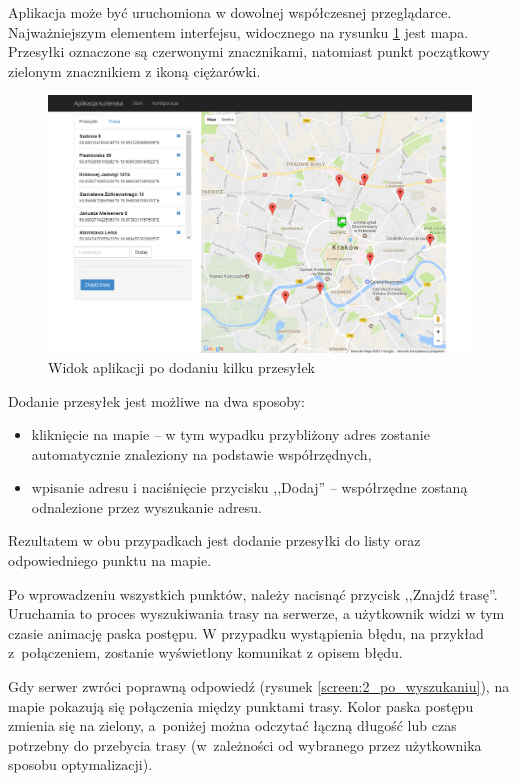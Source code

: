 Aplikacja może być uruchomiona w dowolnej współczesnej przeglądarce. Najważniejszym elementem interfejsu, widocznego na rysunku \ref{screen:1_przed_uruchomieniem} jest mapa. Przesyłki oznaczone są czerwonymi znacznikami, natomiast punkt początkowy zielonym znacznikiem z ikoną ciężarówki.
\begin{figure}
	\centering
	\includegraphics[width=\linewidth]{screen/1_przed_uruchomieniem}
	\caption{Widok aplikacji po dodaniu kilku przesyłek}
	\label{screen:1_przed_uruchomieniem}
\end{figure}

Dodanie przesyłek jest możliwe na dwa sposoby: 
\begin{itemize}
	\item kliknięcie na mapie -- w tym wypadku przybliżony adres zostanie automatycznie znaleziony na podstawie współrzędnych,
	\item wpisanie adresu i naciśnięcie przycisku ,,Dodaj'' -- współrzędne zostaną odnalezione przez wyszukanie adresu.
\end{itemize}

Rezultatem w obu przypadkach jest dodanie przesyłki do listy oraz odpowiedniego punktu na mapie.

Po wprowadzeniu wszystkich punktów, należy nacisnąć przycisk ,,Znajdź trasę''. Uruchamia to proces wyszukiwania trasy na serwerze, a użytkownik widzi w tym czasie animację paska postępu. W przypadku wystąpienia błędu, na przykład z~połączeniem, zostanie wyświetlony komunikat z opisem błędu.

Gdy serwer zwróci poprawną odpowiedź (rysunek \ref{screen:2_po_wyszukaniu}), na mapie pokazują się połączenia między punktami trasy. Kolor paska postępu zmienia się na zielony, a~poniżej można odczytać łączną długość lub czas potrzebny do przebycia trasy (w~zależności od wybranego przez użytkownika sposobu optymalizacji).

